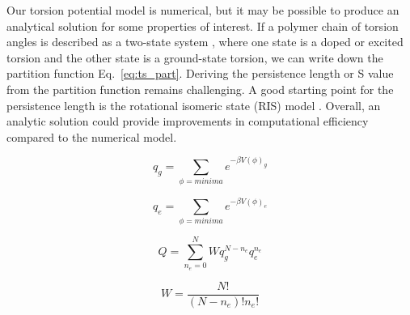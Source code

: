 \begin{itemize}
  Our torsion potential model is numerical, but it may be possible to produce an analytical solution for some properties of interest. If a polymer chain of torsion angles is described as a two-state system \cite{ucb.b1828986320110101}, where one state is a doped or excited torsion and the other state is a ground-state torsion, we can write down the partition function Eq.~\ref{eq:ts_part}. Deriving the persistence length or S value from the partition function remains challenging. A good starting point for the persistence length is the rotational isomeric state (RIS) model \cite{Flory1989}. Overall, an analytic solution could provide improvements in computational efficiency compared to the numerical model.

  \end{itemize}

  \clearpage

  \begin{table}[t!]
  \begin{multicols}{2}
  \begin{equation}
    q_{g} = \sum_{\phi=minima}^{}e^{-\beta V(\phi)_{g}}
  \end{equation}

  \begin{equation}
    q_{e} = \sum_{\phi=minima}^{}e^{-\beta V(\phi)_{e}}
  \end{equation}
\end{multicols}

\begin{multicols}{2}
\begin{equation}
  Q = \sum_{n_e=0}^{N}Wq_{g}^{N-n_e}q_{e}^{n_e}
  \label{eq:ts_part}
\end{equation}

\begin{equation}
  W = \frac{N!}{(N-n_e)!n_e!}
\end{equation}
\end{multicols}
\caption[Two-state Partition Function]{Equations 4.1 and 4.2 represent the ground and excited-state torsional partition functions respectively, where $\beta = 1/k_BT$ and $V(\phi)$ is the torsion potential. Equation 4.3 is the partition function for a chain with $N$ torsion angles. The variable $W$ signifies the multiplicity, where $n_e$ is the number of excited torsion.}
\end{table}




